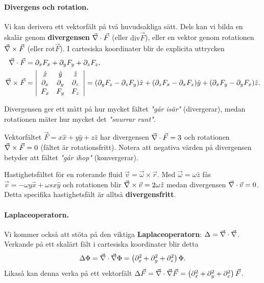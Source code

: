 \documentclass[%
oneside,                 %
final,                   %
10pt]{article}
\newenvironment{notice_mdfboxadmon}[1][]{
\begin{notice_mdfboxmdframed}[frametitle=#1]
}
{
\end{notice_mdfboxmdframed}
}
\begin{document}
\paragraph{Divergens och rotation.}
Vi kan derivera ett vektorfält på två huvudsakliga sätt. Dels kan vi bilda en skalär genom \textbf{divergensen} $\vec{\nabla} \cdot \vec{F}$ (eller $\mathrm{div} \vec{F}$), eller en vektor genom rotationen $\vec{\nabla} \times \vec{F}$ (eller $\mathrm{rot} \vec{F}$). I cartesiska koordinater blir de explicita uttrycken
\begin{align}
\vec{\nabla} \cdot \vec{F} &= \partial_x F_x + \partial_y F_y + \partial_z F_z, \\ 
\vec{\nabla} \times \vec{F} & = \left| 
\begin{array}{ccc}
\hat{x} & \hat{y} & \hat{z} \\ 
\partial_{x} & \partial_{y} & \partial_{z} \\ 
F_x & F_y & F_z
\end{array}
\right|
= (\partial_y F_z - \partial_z F_y)\hat{x} + (\partial_z F_x - \partial_x F_z)\hat{y} + (\partial_x F_y - \partial_y F_x) \hat{z}.
\end{align}

Divergensen ger ett mått på hur mycket fältet \emph{"går isär"} (divergerar), medan rotationen mäter hur mycket det \emph{"snurrar runt"}. 


\begin{notice_mdfboxadmon}
Vektorfältet $\vec{F} = x\hat{x} + y\hat{y} + z\hat{z}$ har divergensen $\vec{\nabla} \cdot \vec{F} = 3$ och rotationen $\vec{\nabla} \times \vec{F} = 0$ (fältet är rotationsfritt). Notera att negativa värden på divergensen betyder att fältet \emph{"går ihop"} (konvergerar).
\end{notice_mdfboxadmon} %




\begin{notice_mdfboxadmon}
Hastighetsfältet för en roterande fluid $\vec{v} = \vec{\omega} \times \vec{r}$. Med $\vec{\omega} = \omega \hat{z}$ fås $\vec{v} = -\omega y\hat{x} + \omega sx\hat{y}$ och rotationen blir $\vec{\nabla} \times \vec{v} = 2 \omega \hat{z}$ medan divergensen $\vec{\nabla} \cdot \vec{v} = 0$. Detta specifika hastighetsfält är alltså \textbf{divergensfritt}.
\end{notice_mdfboxadmon} %



\paragraph{Laplaceoperatorn.}
Vi kommer också att stöta på den viktiga \textbf{Laplaceoperatorn}: $\Delta = \vec{\nabla} \cdot \vec{\nabla}$. Verkande på ett skalärt fält i cartesiska koordinater blir detta
\begin{equation}
\Delta \Phi = \vec{\nabla} \cdot \vec{\nabla} \Phi = \left( \partial_x^2 + \partial_y^2 + \partial_z^2 \right) \Phi.
\end{equation}
Likaså kan denna verka på ett vektorfält $\Delta \vec{F} = \vec{\nabla} \cdot \vec{\nabla} \vec{F} = \left( \partial_x^2 + \partial_y^2 + \partial_z^2 \right) \vec{F}$.
\end{document}
